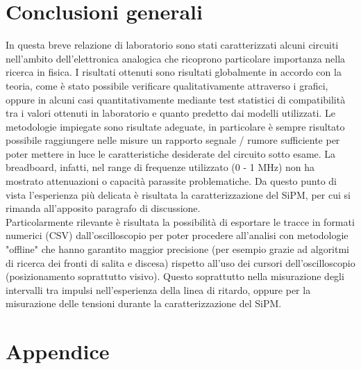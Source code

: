 \documentclass[journal]{IEEEtran}
\begin{document}
\section{Conclusioni generali} %
In questa breve relazione di laboratorio sono stati caratterizzati alcuni circuiti nell'ambito dell'elettronica analogica che ricoprono particolare importanza nella ricerca in fisica. I risultati ottenuti sono risultati globalmente in accordo con la teoria, come è stato possibile verificare qualitativamente attraverso i grafici, oppure in alcuni casi quantitativamente mediante test statistici di compatibilità tra i valori ottenuti in laboratorio e quanto predetto dai modelli utilizzati. Le metodologie impiegate sono risultate adeguate, in particolare è sempre risultato possibile raggiungere nelle misure un rapporto segnale / rumore sufficiente per poter mettere in luce le caratteristiche desiderate del circuito sotto esame. La breadboard, infatti, nel range di frequenze utilizzato (0 - 1 MHz) non ha mostrato attenuazioni o capacità parassite problematiche. Da questo punto di vista l'esperienza più delicata è risultata la caratterizzazione del SiPM, per cui si rimanda all'apposito paragrafo di discussione. \\

Particolarmente rilevante è risultata la possibilità di esportare le tracce in formati numerici (CSV) dall'oscilloscopio per poter procedere all'analisi con metodologie "offline" che hanno garantito maggior precisione (per esempio grazie ad algoritmi di ricerca dei fronti di salita e discesa) rispetto all'uso dei cursori dell'oscilloscopio (posizionamento soprattutto visivo). Questo soprattutto nella misurazione degli intervalli tra impulsi nell'esperienza della linea di ritardo, oppure per la misurazione delle tensioni durante la caratterizzazione del SiPM.

\section{Appendice}
\end{document}
